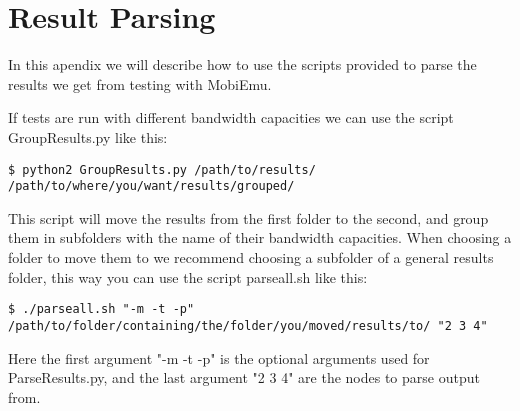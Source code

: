 \section{Result Parsing}\label{Result Parsing}
    In this apendix we will describe how to use the scripts provided to parse the results we get from testing with MobiEmu.
    
    If tests are run with different bandwidth capacities we can use the script GroupResults.py like this:
    \lstset{language=bash, style=shell}
    \begin{lstlisting}
$ python2 GroupResults.py /path/to/results/ /path/to/where/you/want/results/grouped/
    \end{lstlisting}
    This script will move the results from the first folder to the second, and group them in subfolders with the name of their bandwidth capacities. When choosing a folder to move them to we recommend choosing a subfolder of a general results folder, this way you can use the script parseall.sh like this:
    \begin{lstlisting}
$ ./parseall.sh "-m -t -p" /path/to/folder/containing/the/folder/you/moved/results/to/ "2 3 4"
    \end{lstlisting}
    Here the first argument "-m -t -p" is the optional arguments used for ParseResults.py, and the last argument "2 3 4" are the nodes to parse output from.
